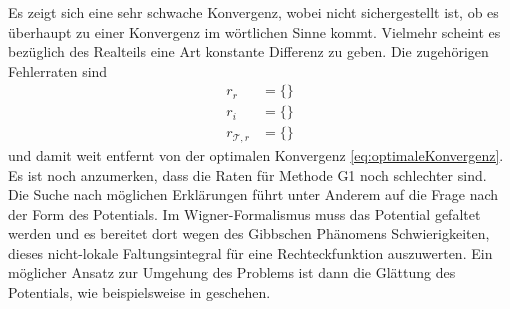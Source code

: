 Es zeigt sich eine sehr schwache Konvergenz, wobei nicht sichergestellt ist, ob es überhaupt zu einer Konvergenz im wörtlichen Sinne kommt. Vielmehr scheint es bezüglich des Realteils eine Art konstante Differenz zu geben. Die zugehörigen Fehlerraten sind
\begin{equation*}
  \begin{aligned}
    r_r &= \{\} \\
    r_i &= \{\} \\
    r_{\mathcal{T},r} &= \{\}
  \end{aligned}
\end{equation*}
und damit weit entfernt von der optimalen Konvergenz \eqref{eq:optimaleKonvergenz}. Es ist noch anzumerken, dass die Raten für Methode G1 noch schlechter sind. Die Suche nach möglichen Erklärungen führt unter Anderem auf die Frage nach der Form des Potentials. Im Wigner-Formalismus muss das Potential gefaltet werden und es bereitet dort wegen des Gibbschen Phänomens Schwierigkeiten, dieses nicht-lokale Faltungsintegral für eine Rechteckfunktion auszuwerten. Ein möglicher Ansatz zur Umgehung des Problems ist dann die Glättung des Potentials, wie beispielsweise in \cite{wiedenhaus} geschehen.

